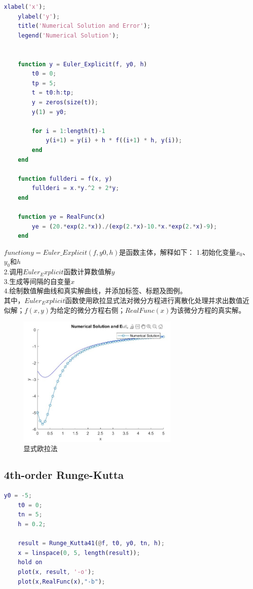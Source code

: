 \documentclass[12pt, a4paper, oneside]{ctexart}
\begin{document}
\begin{spacing}{2.0}
\begin{lstlisting}[language=MATLAB, caption=显式欧拉法]
    xlabel('x');
    ylabel('y');
    title('Numerical Solution and Error');
    legend('Numerical Solution');
    
    
    function y = Euler_Explicit(f, y0, h)
        t0 = 0;
        tp = 5;
        t = t0:h:tp;
        y = zeros(size(t));
        y(1) = y0;
    
        for i = 1:length(t)-1
            y(i+1) = y(i) + h * f((i+1) * h, y(i));
        end
    end
    
    function fullderi = f(x, y)
        fullderi = x.*y.^2 + 2*y;
    end
    
    function ye = RealFunc(x)
        ye = (20.*exp(2.*x))./(exp(2.*x)-10.*x.*exp(2.*x)-9);
    end    
\end{lstlisting}
$    function y = Euler\_Explicit(f, y0, h)$是函数主体，解释如下：
1.初始化变量$x_0$、$y_0$和$h$ \\
2.调用$Euler_Explicit$函数计算数值解$y$ \\
3.生成等间隔的自变量$x$ \\
4.绘制数值解曲线和真实解曲线，并添加标签、标题及图例。 \\
其中，$Euler_Explicit$函数使用欧拉显式法对微分方程进行离散化处理并求出数值近似解；$f(x,y)$为给定的微分方程右侧；$RealFunc(x)$为该微分方程的真实解。
\begin{figure}[htbp][H]
    \centering
    \includegraphics[width=8cm]{EE.jpg}
    \caption{显式欧拉法}
\end{figure}

\subsection{4th-order Runge-Kutta}
\begin{lstlisting}[language=MATLAB, caption=4th-order Runge-Kutta]
    y0 = -5;
    t0 = 0;
    tn = 5;
    h = 0.2;
    
    result = Runge_Kutta41(@f, t0, y0, tn, h);
    x = linspace(0, 5, length(result));
    hold on
    plot(x, result, '-o');
    plot(x,RealFunc(x),"-b");
    

\end{lstlisting}
\end{spacing}
\end{document}
